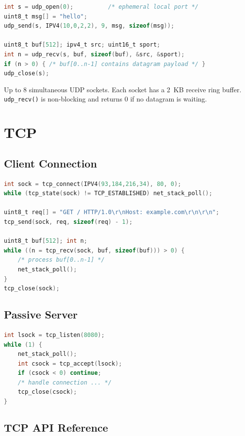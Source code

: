 \documentclass[11pt,a4paper]{report}
\begin{document}
\begin{lstlisting}[language=C]
int s = udp_open(0);          /* ephemeral local port */
uint8_t msg[] = "hello";
udp_send(s, IPV4(10,0,2,2), 9, msg, sizeof(msg));

uint8_t buf[512]; ipv4_t src; uint16_t sport;
int n = udp_recv(s, buf, sizeof(buf), &src, &sport);
if (n > 0) { /* buf[0..n-1] contains datagram payload */ }
udp_close(s);
\end{lstlisting}

Up to 8 simultaneous UDP sockets.  Each socket has a 2~KB receive ring
buffer.  \texttt{udp\_recv()} is non-blocking and returns 0 if no datagram
is waiting.

\section{TCP}

\subsection{Client Connection}

\begin{lstlisting}[language=C]
int sock = tcp_connect(IPV4(93,184,216,34), 80, 0);
while (tcp_state(sock) != TCP_ESTABLISHED) net_stack_poll();

uint8_t req[] = "GET / HTTP/1.0\r\nHost: example.com\r\n\r\n";
tcp_send(sock, req, sizeof(req) - 1);

uint8_t buf[512]; int n;
while ((n = tcp_recv(sock, buf, sizeof(buf))) > 0) {
    /* process buf[0..n-1] */
    net_stack_poll();
}
tcp_close(sock);
\end{lstlisting}

\subsection{Passive Server}

\begin{lstlisting}[language=C]
int lsock = tcp_listen(8080);
while (1) {
    net_stack_poll();
    int csock = tcp_accept(lsock);
    if (csock < 0) continue;
    /* handle connection ... */
    tcp_close(csock);
}
\end{lstlisting}

\subsection{TCP API Reference}
\end{document}
